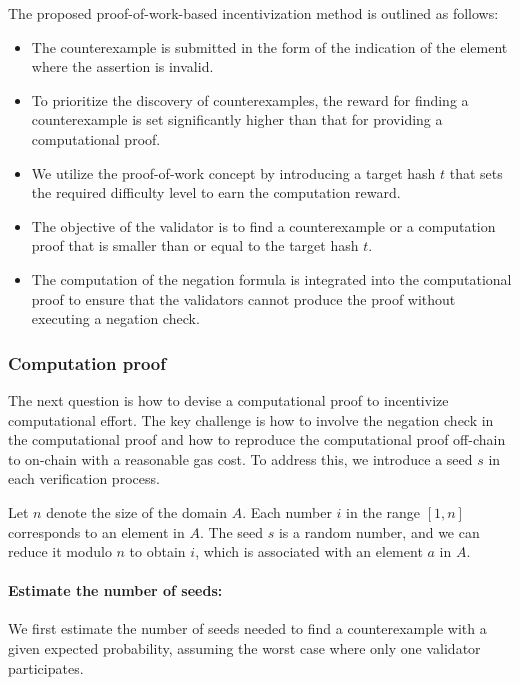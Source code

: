 \documentclass[runningheads]{llncs}
\begin{document}
The proposed proof-of-work-based incentivization method is outlined as follows:
\begin{itemize}
    \item The counterexample is submitted in the form of the indication of the element where the assertion is invalid.
    \item To prioritize the discovery of counterexamples, the reward for finding a counterexample is set significantly higher than that for providing a computational proof.
    \item We utilize the proof-of-work concept by introducing a target hash $t$ that sets the required difficulty level to earn the computation reward.
    \item The objective of the validator is to find a counterexample or a computation proof that is smaller than or equal to the target hash $t$.
    \item The computation of the negation formula is integrated into the computational proof to ensure that the validators cannot produce the proof without executing a negation check.
\end{itemize}
\subsubsection{Computation proof}
The next question is how to devise a computational proof to incentivize computational effort. The key challenge is how to involve the negation check in the computational proof and how to reproduce the computational proof off-chain to on-chain with a reasonable gas cost. To address this, we introduce a seed $s$ in each verification process.

Let \( n \) denote the size of the domain \( A \). Each number \( i \) in the range \([1, n]\) corresponds to an element in \( A \). The seed \( s \) is a random number, and we can reduce it modulo \( n \) to obtain \( i \), which is associated with an element \( a \) in \( A \).

\paragraph{Estimate the number of seeds:} We first estimate the number of seeds needed to find a counterexample with a given expected probability, assuming the worst case where only one validator participates.
\end{document}
